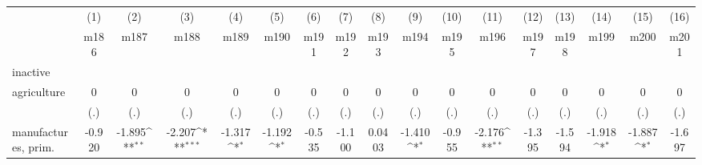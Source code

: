 {
\def\sym#1{\ifmmode^{#1}\else\(^{#1}\)\fi}
\begin{tabular}{l*{16}{c}}
\hline\hline
                    &\multicolumn{1}{c}{(1)}&\multicolumn{1}{c}{(2)}&\multicolumn{1}{c}{(3)}&\multicolumn{1}{c}{(4)}&\multicolumn{1}{c}{(5)}&\multicolumn{1}{c}{(6)}&\multicolumn{1}{c}{(7)}&\multicolumn{1}{c}{(8)}&\multicolumn{1}{c}{(9)}&\multicolumn{1}{c}{(10)}&\multicolumn{1}{c}{(11)}&\multicolumn{1}{c}{(12)}&\multicolumn{1}{c}{(13)}&\multicolumn{1}{c}{(14)}&\multicolumn{1}{c}{(15)}&\multicolumn{1}{c}{(16)}\\
                    &\multicolumn{1}{c}{m186}&\multicolumn{1}{c}{m187}&\multicolumn{1}{c}{m188}&\multicolumn{1}{c}{m189}&\multicolumn{1}{c}{m190}&\multicolumn{1}{c}{m191}&\multicolumn{1}{c}{m192}&\multicolumn{1}{c}{m193}&\multicolumn{1}{c}{m194}&\multicolumn{1}{c}{m195}&\multicolumn{1}{c}{m196}&\multicolumn{1}{c}{m197}&\multicolumn{1}{c}{m198}&\multicolumn{1}{c}{m199}&\multicolumn{1}{c}{m200}&\multicolumn{1}{c}{m201}\\
\hline
inactive            &                     &                     &                     &                     &                     &                     &                     &                     &                     &                     &                     &                     &                     &                     &                     &                     \\
agriculture         &           0         &           0         &           0         &           0         &           0         &           0         &           0         &           0         &           0         &           0         &           0         &           0         &           0         &           0         &           0         &           0         \\
                    &         (.)         &         (.)         &         (.)         &         (.)         &         (.)         &         (.)         &         (.)         &         (.)         &         (.)         &         (.)         &         (.)         &         (.)         &         (.)         &         (.)         &         (.)         &         (.)         \\
[1em]
manufactures, prim. &      -0.920         &      -1.895\sym{**} &      -2.207\sym{***}&      -1.317\sym{*}  &      -1.192\sym{*}  &      -0.535         &      -1.100         &      0.0403         &      -1.410\sym{*}  &      -0.955         &      -2.176\sym{**} &      -1.395         &      -1.594         &      -1.918\sym{*}  &      -1.887\sym{*}  &      -1.697         \\

\end{tabular}}
